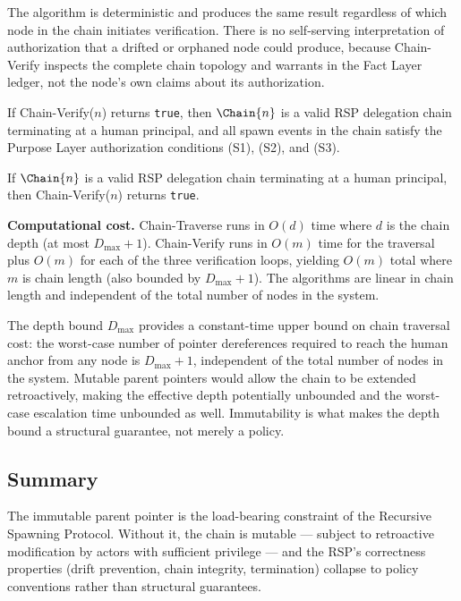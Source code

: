 The algorithm is deterministic and produces the same result regardless of which node in the chain initiates verification. There is no self-serving interpretation of authorization that a drifted or orphaned node could produce, because Chain-Verify inspects the complete chain topology and warrants in the Fact Layer ledger, not the node's own claims about its authorization.

\begin{prop}
\label{prop:chain-verify-soundness}
If Chain-Verify($n$) returns \texttt{true}, then $\Chain{n}$ is a valid RSP delegation chain terminating at a human principal, and all spawn events in the chain satisfy the Purpose Layer authorization conditions (S1), (S2), and (S3).
\end{prop}

\begin{prop}
\label{prop:chain-verify-completeness}
If $\Chain{n}$ is a valid RSP delegation chain terminating at a human principal, then Chain-Verify($n$) returns \texttt{true}.
\end{prop}

\medskip
\noindent\textbf{Computational cost.} Chain-Traverse runs in $O(d)$ time where $d$ is the chain depth (at most $D_{\max} + 1$). Chain-Verify runs in $O(m)$ time for the traversal plus $O(m)$ for each of the three verification loops, yielding $O(m)$ total where $m$ is chain length (also bounded by $D_{\max} + 1$). The algorithms are linear in chain length and independent of the total number of nodes in the system.

The depth bound $D_{\max}$ provides a constant-time upper bound on chain traversal cost: the worst-case number of pointer dereferences required to reach the human anchor from any node is $D_{\max} + 1$, independent of the total number of nodes in the system. Mutable parent pointers would allow the chain to be extended retroactively, making the effective depth potentially unbounded and the worst-case escalation time unbounded as well. Immutability is what makes the depth bound a structural guarantee, not merely a policy.

\subsection{Summary}
\label{sec:immutable-parent-pointers-summary}

The immutable parent pointer is the load-bearing constraint of the Recursive Spawning Protocol. Without it, the chain is mutable --- subject to retroactive modification by actors with sufficient privilege --- and the RSP's correctness properties (drift prevention, chain integrity, termination) collapse to policy conventions rather than structural guarantees.

